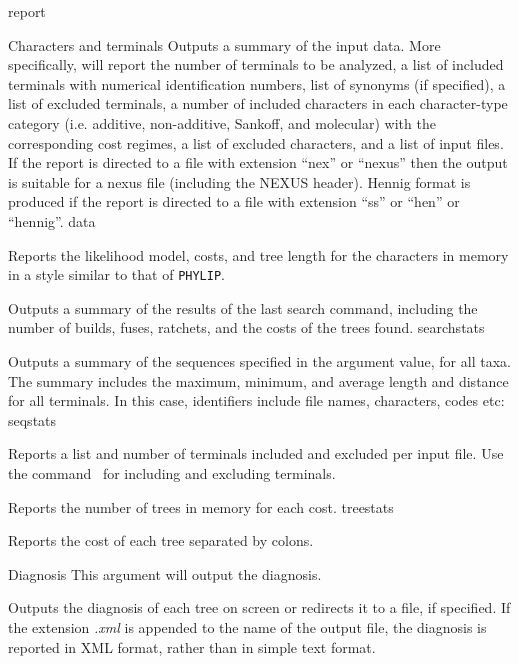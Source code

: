 \begin{command}{report}{}
\begin{arguments}
\begin{argumentgroup}{Characters and terminals}
{Outputs a summary of the input data.
More specifically, \poy will report the number of
terminals to be analyzed, a list of included terminals with
numerical identification numbers, list
of synonyms (if specified), a list of excluded terminals, a
number of included characters in each character-type category
(i.e. additive, non-additive, Sankoff, and molecular) with the corresponding
cost regimes, a list of excluded
characters, and a list of input files. If the report is directed
to a file with extension ``nex'' or ``nexus'' then
the output is suitable for a nexus file (including the NEXUS
header). Hennig format is produced if the report is directed
to a file with extension ``ss'' or ``hen'' or ``hennig''.}
{data}

{Reports the likelihood model, costs, and tree length for the
characters in memory in a style similar to that of \texttt{PHYLIP}.}
{}

{Outputs a summary of the results of the last search command,
including the number of builds, fuses, ratchets, and the costs of
the trees found.}
{searchstats}

{Outputs a summary of the sequences specified in the argument
value, for all taxa. The summary includes the maximum, minimum,
and average length and distance for all terminals. In this case, identifiers
include file names, characters, codes etc:}
{seqstats}

{Reports a list and number of terminals included and excluded
per input file. Use the command~ for including and excluding
terminals.}
{}

{Reports the number of trees in memory for each cost.}
{treestats}

{Reports the cost of each tree separated by colons.}
{}

\end{argumentgroup}

\begin{argumentgroup}{Diagnosis}
{This argument will output the diagnosis.} 

{Outputs the diagnosis of each tree on screen or redirects it to a file, if
specified. If the extension \emph{.xml} is appended to the name of the
output file, the diagnosis is reported in XML format, rather than in
simple text format. %
} 
{}


\end{argumentgroup}
\end{arguments}
\end{command}
